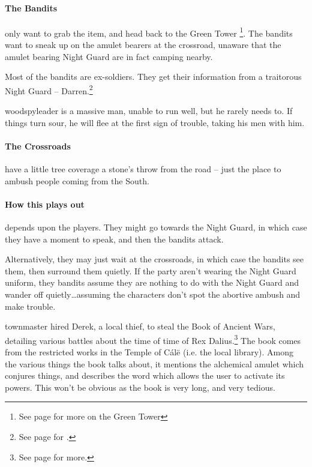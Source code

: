 \begin{multicols}{2}

\paragraph{The Bandits} only want to grab the item, and head back to the Green Tower \footnote{See page \pageref{green_tower} for more on the Green Tower}.
The bandits want to sneak up on the amulet bearers at the crossroad, unaware that the amulet bearing Night Guard are in fact camping nearby.

Most of the bandits are ex-soldiers.
They get their information from a traitorous Night Guard -- Darren.\footnote{See page \pageref{traitor} for .}


\woodspyleader

\Gls{woodspyleader} is a massive man, unable to run well, but he rarely needs to.
If things turn sour, he will flee at the first sign of trouble, taking his men with him.

\paragraph{The Crossroads} have a little tree coverage a stone's throw from the road -- just the place to ambush people coming from the South.

\paragraph{How this plays out} depends upon the players.
They might go towards the Night Guard, in which case they have a moment to speak, and then the bandits attack.

Alternatively, they may just wait at the crossroads, in which case the bandits see them, then surround them quietly.
If the party aren't wearing the Night Guard uniform, they bandits assume they are nothing to do with the Night Guard and wander off quietly\ldots assuming the characters don't spot the abortive ambush and make trouble.


\Gls{townmaster} hired Derek, a local thief, to steal the Book of Ancient Wars, detailing various battles about the time of time of Rex Dalius.\footnote{See page \pageref{h_dalius} for more.}
The book comes from the restricted works in the Temple of C\'{a}l\"{e} (i.e. the local library).
Among the various things the book talks about, it mentions the alchemical amulet which conjures things, and describes the word which allows the user to activate its powers.
This won't be obvious as the book is very long, and very tedious.


\end{multicols}
